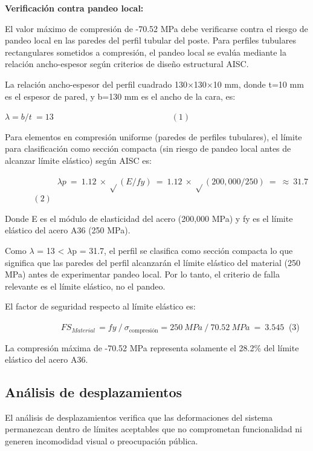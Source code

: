 \documentclass[12pt,a4paper,oneside]{report}
\begin{document}
\textbf{Verificación contra pandeo local:}

El valor máximo de compresión de -70.52 MPa debe verificarse contra el riesgo de pandeo local en las paredes del perfil tubular del poste. Para perfiles tubulares rectangulares sometidos a compresión, el pandeo local se evalúa mediante la relación ancho-espesor según criterios de diseño estructural AISC.

La relación ancho-espesor del perfil cuadrado 130\ensuremath{\times}130\ensuremath{\times}10 mm, donde t=10 mm es el espesor de pared, y b=130 mm es el ancho de la cara, es:

\(\lambda = b/t\  = 13\)\(\ \ \ \ \ \ \ \ \ \ \ \ \ \ \ \ \ \ \ \ \ \ \ \ \ \ \ \ \ \ \ \ \ \ \ \ \ \ \ \ \ \ \ \ \ \ \ \ \ \ \ \ \ \ \ \ \ \ \ \ \ \ \ (1)\)

Para elementos en compresión uniforme (paredes de perfiles tubulares), el límite para clasificación como sección compacta (sin riesgo de pandeo local antes de alcanzar límite elástico) según AISC es:

\(\ \ \ \ \ \ \ \ \ \ \ \ \ \ \ \ \ \ \ \ \ \ \ \ \ \ \ \ \lambda p\  = \ 1.12\  \times \ \sqrt{}(E/fy)\  = \ 1.12\  \times \ \sqrt{}(200,000/250)\  = \  \approx \ 31.7\)\(\ \ \ \ \ \ \ \ \ \ \ \ \ \ \ (2)\)

Donde E es el módulo de elasticidad del acero (200,000 MPa) y fy es el límite elástico del acero A36 (250 MPa).

Como \ensuremath{\lambda} = 13 \textless{} \ensuremath{\lambda}p = 31.7, el perfil se clasifica como sección compacta lo que significa que las paredes del perfil alcanzarán el límite elástico del material (250 MPa) antes de experimentar pandeo local. Por lo tanto, el criterio de falla relevante es el límite elástico, no el pandeo.

El factor de seguridad respecto al límite elástico es:

\(\ \ \ \ \ \ \ \ \ \ \ \ \ \ \ \ \ \ \ \ \ \ \ \ \ \ \ \ \ \ FS_{Material\ } = fy\ /\ \sigma_{\text{compresión}} = 250\ MPa\ /\ 70.52\ MPa\  = \ 3.545\ \) (3)

La compresión máxima de -70.52 MPa representa solamente el 28.2\% del límite elástico del acero A36.

\subsection{Análisis de desplazamientos}\label{anuxe1lisis-de-desplazamientos}

El análisis de desplazamientos verifica que las deformaciones del sistema permanezcan dentro de límites aceptables que no comprometan funcionalidad ni generen incomodidad visual o preocupación pública.
\end{document}
